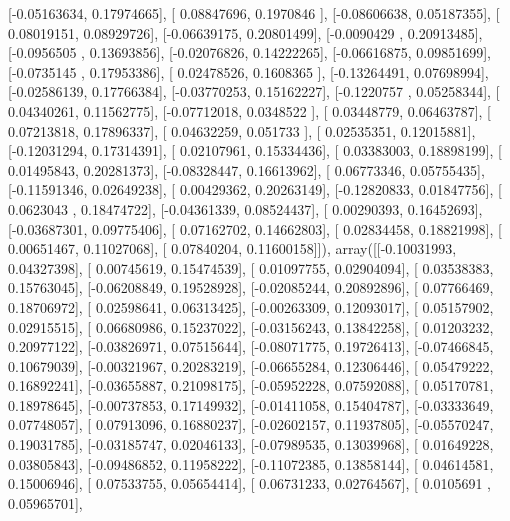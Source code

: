 \documentclass{article}
\begin{document}
       [-0.05163634,  0.17974665],
       [ 0.08847696,  0.1970846 ],
       [-0.08606638,  0.05187355],
       [ 0.08019151,  0.08929726],
       [-0.06639175,  0.20801499],
       [-0.0090429 ,  0.20913485],
       [-0.0956505 ,  0.13693856],
       [-0.02076826,  0.14222265],
       [-0.06616875,  0.09851699],
       [-0.0735145 ,  0.17953386],
       [ 0.02478526,  0.1608365 ],
       [-0.13264491,  0.07698994],
       [-0.02586139,  0.17766384],
       [-0.03770253,  0.15162227],
       [-0.1220757 ,  0.05258344],
       [ 0.04340261,  0.11562775],
       [-0.07712018,  0.0348522 ],
       [ 0.03448779,  0.06463787],
       [ 0.07213818,  0.17896337],
       [ 0.04632259,  0.051733  ],
       [ 0.02535351,  0.12015881],
       [-0.12031294,  0.17314391],
       [ 0.02107961,  0.15334436],
       [ 0.03383003,  0.18898199],
       [ 0.01495843,  0.20281373],
       [-0.08328447,  0.16613962],
       [ 0.06773346,  0.05755435],
       [-0.11591346,  0.02649238],
       [ 0.00429362,  0.20263149],
       [-0.12820833,  0.01847756],
       [ 0.0623043 ,  0.18474722],
       [-0.04361339,  0.08524437],
       [ 0.00290393,  0.16452693],
       [-0.03687301,  0.09775406],
       [ 0.07162702,  0.14662803],
       [ 0.02834458,  0.18821998],
       [ 0.00651467,  0.11027068],
       [ 0.07840204,  0.11600158]]), array([[-0.10031993,  0.04327398],
       [ 0.00745619,  0.15474539],
       [ 0.01097755,  0.02904094],
       [ 0.03538383,  0.15763045],
       [-0.06208849,  0.19528928],
       [-0.02085244,  0.20892896],
       [ 0.07766469,  0.18706972],
       [ 0.02598641,  0.06313425],
       [-0.00263309,  0.12093017],
       [ 0.05157902,  0.02915515],
       [ 0.06680986,  0.15237022],
       [-0.03156243,  0.13842258],
       [ 0.01203232,  0.20977122],
       [-0.03826971,  0.07515644],
       [-0.08071775,  0.19726413],
       [-0.07466845,  0.10679039],
       [-0.00321967,  0.20283219],
       [-0.06655284,  0.12306446],
       [ 0.05479222,  0.16892241],
       [-0.03655887,  0.21098175],
       [-0.05952228,  0.07592088],
       [ 0.05170781,  0.18978645],
       [-0.00737853,  0.17149932],
       [-0.01411058,  0.15404787],
       [-0.03333649,  0.07748057],
       [ 0.07913096,  0.16880237],
       [-0.02602157,  0.11937805],
       [-0.05570247,  0.19031785],
       [-0.03185747,  0.02046133],
       [-0.07989535,  0.13039968],
       [ 0.01649228,  0.03805843],
       [-0.09486852,  0.11958222],
       [-0.11072385,  0.13858144],
       [ 0.04614581,  0.15006946],
       [ 0.07533755,  0.05654414],
       [ 0.06731233,  0.02764567],
       [ 0.0105691 ,  0.05965701],
\end{document}

